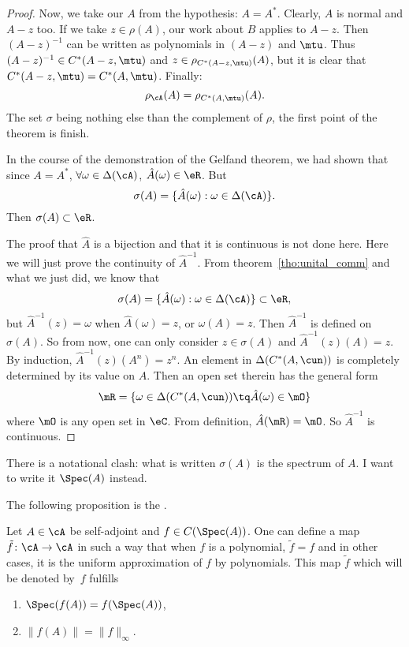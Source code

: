 \begin{proof}
Now, we take our $A$ from the hypothesis: $A=A^*$. Clearly, $A$ is normal and $A-z$ too. If we take $z\in\rho(A)$, our work about $B$ applies to $A-z$. Then $(A-z)^{-1}$ can be written as polynomials in $(A-z)$ and $\mtu$. Thus $(A-z)^{-1}\in C^*(A-z,\mtu)$ and
$z\in\rho_{C^*(A-z,\mtu)}(A)$, but it is clear that $C^*(A-z,\mtu)=C^*(A,\mtu)$. Finally:
\[
   \rho_{\cA}(A)=\rho_{C^*(A,\mtu)}(A).
\]
The set $\sigma$ being nothing else than the complement of $\rho$, the first point of the theorem is finish.

In the course of the demonstration of the Gelfand theorem, we had shown that since $A=A^*$, $\forall\omega\in\Delta(\cA)$, $\hat A(\omega)\in\eR$. But
\[
   \sigma(A)=\{\hat A(\omega):\omega\in\Delta(\cA)\}.
\]
Then $\sigma(A)\subset\eR$.

The proof that $\hat A$ is a bijection and that it is continuous is not done here. Here we will just prove the continuity of $\hat A^{-1}$. From theorem~\ref{tho:unital_comm} and what we just did, we know that
\[
   \sigma(A)=\{\hat A(\omega):\omega\in\Delta(\cA)\}\subset\eR,
\]
but $\hat A^{-1}(z)=\omega$ when $\hat A(\omega)=z$, or $\omega(A)=z$. Then $\hat A^{-1}$ is defined on $\sigma(A)$. So from now, one can only consider $z\in\sigma(A)$ and $\hat A^{-1}(z)(A)=z$. By induction, $\hat A^{-1}(z)(A^n)=z^n$. An element in $\Delta(C^*(A,\cun))$ is completely determined by its value on $A$. Then an open set therein has the general form
\[
  \mR=\{ \omega\in\Delta(C^*(A,\cun))\tq\hat A(\omega)\in\mO \}
\]
where $\mO$ is any open set in $\eC$. From definition, $\hat A(\mR)=\mO$. So $\hat A^{-1}$ is continuous.

\end{proof}


\begin{probleme}
    There is a notational clash: what is written $\sigma(A)$ is the spectrum of $A$. I want to write it $\Spec(A)$ instead.
\end{probleme}

The following proposition is the .
\begin{theorem}     \label{ThoContFuncCalculus}
Let $A\in\cA$ be self-adjoint and $f\in C(\Spec(A))$. One can define a map $\tilde f\colon \cA\to \cA$ in such a way that when $f$ is a polynomial, $\tilde f=f$ and in other cases, it is the uniform approximation of $f$ by polynomials. This map $\tilde f$ which will be denoted by~$f$ fulfills
\begin{enumerate}
\item $\Spec(f(A))=f(\Spec(A))$,  \label{enuji}
\item $\|f(A)\|=\|f\|_{\infty}$.
\end{enumerate}\label{prop:cont_calc}
\end{theorem}

